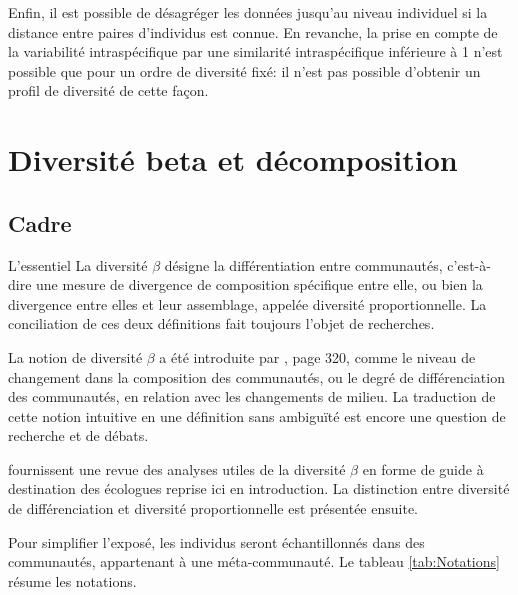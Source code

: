 \documentclass[
  11pt,
  french,
  a4paper,
  extrafontsizes,onecolumn,openright
  ]{memoir}
\newenvironment{Essentiel}
  {\begin{bclogo}[logo=\bctrombone, noborder=true, couleur=lightgray!50]{L'essentiel}\parindent0pt}
  {\end{bclogo}}
\begin{document}
Enfin, il est possible de désagréger les données jusqu'au niveau individuel si la distance entre paires d'individus est connue.
En revanche, la prise en compte de la variabilité intraspécifique par une similarité intraspécifique inférieure à 1 n'est possible que pour un ordre de diversité fixé: il n'est pas possible d'obtenir un profil de diversité de cette façon.

\hypertarget{part-diversituxe9-beta-et-duxe9composition}{%
\part{Diversité beta et décomposition}\label{part-diversituxe9-beta-et-duxe9composition}}

\hypertarget{sec:betaCadre}{%
\chapter{Cadre}\label{sec:betaCadre}}

\scriptsize

\normalsize

\scriptsize

\begin{Essentiel}
La diversité \(\beta\) désigne la différentiation entre communautés,
c'est-à-dire une mesure de divergence de composition spécifique entre
elle, ou bien la divergence entre elles et leur assemblage, appelée
diversité proportionnelle. La conciliation de ces deux définitions fait
toujours l'objet de recherches.
\end{Essentiel}

\normalsize

La notion de diversité \(\beta\) a été introduite par \textcite{Whittaker1960}, page 320, comme le niveau de changement dans la composition des communautés, ou le degré de différenciation des communautés, en relation avec les changements de milieu.
La traduction de cette notion intuitive en une définition sans ambiguïté est encore une question de recherche et de débats.

\textcite{Anderson2011} fournissent une revue des analyses utiles de la diversité \(\beta\) en forme de guide à destination des écologues reprise ici en introduction.
La distinction entre diversité de différenciation et diversité proportionnelle est présentée ensuite.

Pour simplifier l'exposé, les individus seront échantillonnés dans des communautés, appartenant à une méta-communauté.
Le tableau \ref{tab:Notations} résume les notations.
\end{document}
